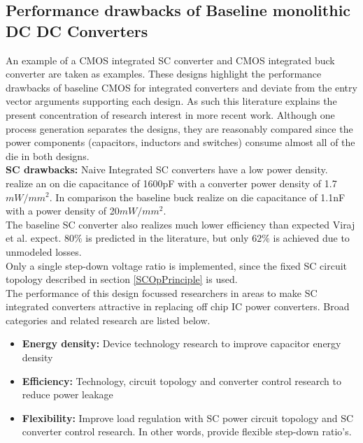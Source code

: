 \documentclass[letterpaper,twocolumn,10pt]{article}
\begin{document}
\subsection{Performance drawbacks of Baseline monolithic DC DC Converters}
An example of a CMOS integrated SC converter \cite{Viraj2007} and CMOS integrated buck converter \cite{Alimadadi2008} are taken as examples. These designs highlight the performance drawbacks of baseline CMOS for integrated converters and deviate from the entry vector arguments supporting each design. As such this literature explains the present concentration of research interest in more recent work. %
Although one process generation separates the designs, they are reasonably compared since the power components (capacitors, inductors and switches) consume almost all of the die in both designs.\\ 
\textbf{SC drawbacks: } Naive Integrated SC converters have a low power density. \cite{Viraj2007} realize an on die capacitance of 1600pF with a converter power density of 1.7$mW/mm^2$. In comparison  the baseline buck \cite{Alimadadi2008} realize on die capacitance of 1.1nF with a power density of 20$mW/mm^2$.\\
The baseline SC converter also realizes much lower efficiency than expected Viraj et al. expect. $80\%$ is predicted in the literature, but only $62\%$ is achieved due to unmodeled losses.\\
Only a single step-down voltage ratio is implemented, since the fixed SC circuit topology described in section \ref{SCOpPrinciple} is used.\\
The performance of this design focussed researchers in areas to make SC integrated converters attractive in replacing off chip IC power converters. Broad categories and related research are listed below.\\
\begin{itemize}
\item \textbf{Energy density: }Device technology research to improve capacitor energy density
\item \textbf{Efficiency: }Technology, circuit topology and converter control research to reduce power leakage
\item \textbf{Flexibility: }Improve load regulation with SC power circuit topology and SC converter control research. In other words, provide flexible step-down ratio's. 
\end{itemize}
\end{document}
